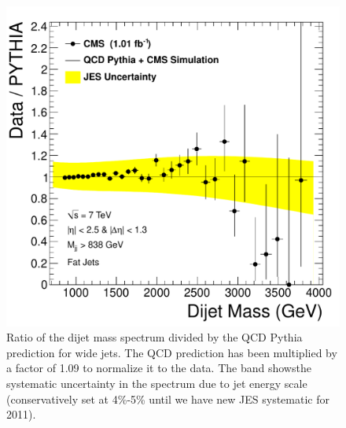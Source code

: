 \begin{figure}[!ht]
  \begin{center}
   \includegraphics[width=\textwidth]{Figures/data_over_pythia_fat.pdf}
    \caption{ Ratio of the dijet mass spectrum divided by the QCD Pythia prediction for wide jets. The
    QCD prediction has been multiplied by a factor of 1.09 to normalize it to the data.
    The band showsthe systematic uncertainty in the spectrum due to jet energy
    scale (conservatively set at 4\%-5\% until we have new JES systematic for 2011). }
    \label{DataOverPythia_wide}
  \end{center}
\end{figure}

